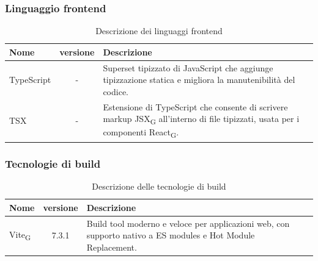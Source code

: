 \documentclass[11pt,a4paper]{article}
\newcommand{\gls}[1]{#1\textsubscript{G}}
\begin{document}
\subsubsection{Linguaggio frontend}
    \begin{table}[H]
        \centering
        \begin{tabular}{|l|c|>{\raggedright\arraybackslash}p{}|p{}|}
            \hline
            \textbf{Nome} & \textbf{versione} & \textbf{Descrizione} \\
            \hline
            TypeScript & - & Superset tipizzato di JavaScript che aggiunge tipizzazione statica e migliora la manutenibilità del codice. \\
            \hline
            TSX & - & Estensione di TypeScript che consente di scrivere markup \gls{JSX} all'interno di file tipizzati, usata per i componenti \gls{React}. \\
            \hline
        \end{tabular}
        \caption{Descrizione dei linguaggi frontend}
        \label{tab:linguaggi_frontend}
    \end{table}
\subsubsection{Tecnologie di build}
    \begin{table}[H]
        \centering
        \begin{tabular}{|l|c|>{\raggedright\arraybackslash}p{}|p{}|}
            \hline
            \textbf{Nome} & \textbf{versione} & \textbf{Descrizione} \\
            \hline
            \gls{Vite} & 7.3.1 & Build tool moderno e veloce per applicazioni web, con supporto nativo a ES modules e Hot Module Replacement. \\
            \hline
        \end{tabular}
        \caption{Descrizione delle tecnologie di build}
        \label{tab:tecnologie_build}
    \end{table}
\end{document}
